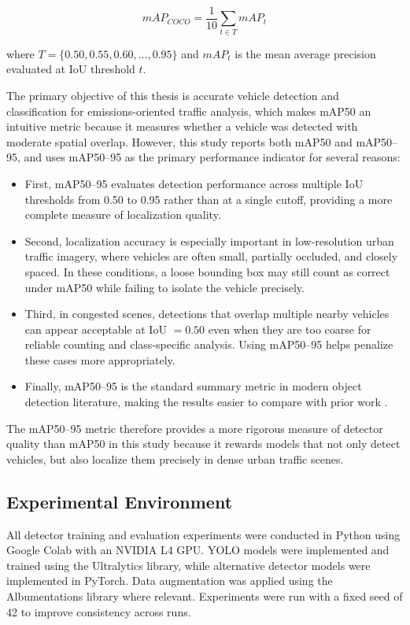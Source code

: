 \begin{equation}
mAP_{COCO} = \frac{1}{10} \sum_{t \in T}mAP_t
\end{equation}

where $T = \{0.50, 0.55, 0.60, \dots, 0.95\}$ and $mAP_t$ is the mean average 
precision evaluated at IoU threshold $t$. 

The primary objective of this thesis is accurate vehicle detection and classification
for emissions-oriented traffic analysis, which makes mAP50 an intuitive metric because
it measures whether a vehicle was detected with moderate spatial overlap. However,
this study reports both mAP50 and mAP50--95, and uses mAP50--95 as the primary
performance indicator for several reasons:
\begin{itemize}
    \item First, mAP50--95 evaluates detection performance across multiple IoU thresholds
    from 0.50 to 0.95 rather than at a single cutoff, providing a more complete
    measure of localization quality.

    \item Second, localization accuracy is especially important in low-resolution
    urban traffic imagery, where vehicles are often small, partially occluded, and
    closely spaced. In these conditions, a loose bounding box may still count as
    correct under mAP50 while failing to isolate the vehicle precisely.

    \item Third, in congested scenes, detections that overlap multiple nearby
    vehicles can appear acceptable at IoU $= 0.50$ even when they are too coarse
    for reliable counting and class-specific analysis. Using mAP50--95 helps penalize
    these cases more appropriately.

    \item Finally, mAP50--95 is the standard summary metric in modern object
    detection literature, making the results easier to compare with prior work
    \cite{lin_microsoft_2015, ultralytics_coco}.
\end{itemize}

The mAP50--95 metric therefore provides a more rigorous measure of detector quality
than mAP50 in this study because it rewards models that not only detect vehicles, but
also localize them precisely in dense urban traffic scenes.


\subsection{Experimental Environment}
All detector training and evaluation experiments were conducted in Python using 
Google Colab with an NVIDIA L4 GPU. YOLO models were implemented and trained using 
the Ultralytics library, while alternative detector models were implemented in 
PyTorch. Data augmentation was applied using the Albumentations library where 
relevant. Experiments were run with a fixed seed of 42 to improve consistency 
across runs.

